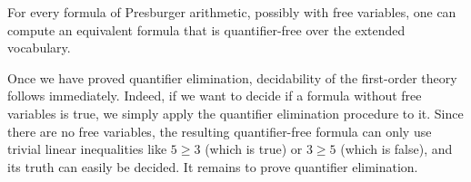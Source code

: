 \begin{theorem}\label{thm:presburger-quantifier-elimination}
	For every formula of Presburger arithmetic, possibly with free variables, one can compute an equivalent formula that is quantifier-free over the extended vocabulary.
\end{theorem}

Once we have proved quantifier elimination, decidability of the first-order theory follows immediately. Indeed, if we want to decide if a formula without free variables is true, we simply apply the quantifier elimination procedure to it. Since there are no free variables, the resulting quantifier-free formula can only use trivial linear inequalities like $5 \ge 3$ (which is true) or $3 \ge 5$ (which is false), and its truth can easily be decided. It remains to prove quantifier elimination.

